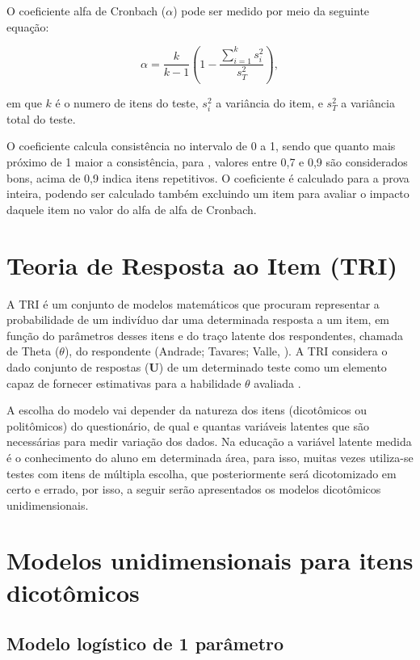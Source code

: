 O coeficiente alfa de Cronbach ($\alpha$) pode ser medido por meio da seguinte equação:

\begin{equation}
	\alpha = \frac{k}{k-1}(1 - \frac{\sum_{i=1}^{k}{s^2_i}}{s_T^2}),
\end{equation}

 \noindent em que $k$ é o numero de itens do teste, ${s_i^2}$ a variância do item, e
${s_T^2}$ a variância total do teste.

O coeficiente calcula consistência no intervalo de 0 a 1, sendo que quanto mais próximo de 1 maior a consistência, para , valores entre 0,7 e 0,9 são considerados bons, acima de 0,9 indica itens repetitivos. 
O coeficiente é calculado para a prova inteira, podendo ser calculado também excluindo um item para avaliar o impacto daquele item no valor do alfa de  alfa de Cronbach.

\section{Teoria de Resposta ao Item (TRI)}

A TRI é um conjunto de modelos matemáticos que procuram representar a probabilidade de um indivíduo dar uma determinada resposta a um item, em função do parâmetros desses itens e do traço latente dos respondentes, chamada de Theta ($\theta$), do respondente (Andrade; Tavares; Valle, \citeyear{de2000teoria}). A TRI considera o dado conjunto de respostas ($\textbf{U}$) de um determinado teste como um elemento capaz de fornecer estimativas para a habilidade $\theta$ avaliada \cite{baker2001}.


A escolha do modelo vai depender da natureza dos itens (dicotômicos ou politômicos) do questionário, de qual e quantas variáveis latentes que são necessárias para medir variação dos dados. Na educação a variável latente medida é o conhecimento do aluno em determinada área, para isso, muitas vezes utiliza-se testes com itens de múltipla escolha, que posteriormente será dicotomizado em certo e errado, por isso, a seguir serão apresentados os modelos dicotômicos unidimensionais. 

\section{Modelos unidimensionais para itens dicotômicos}

\subsection{Modelo logístico de 1 parâmetro}

